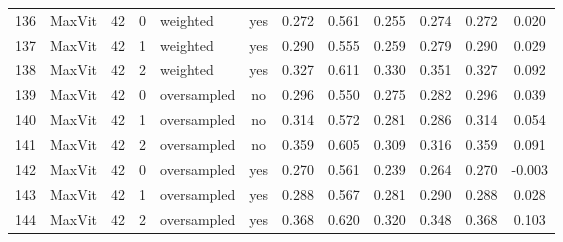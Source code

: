 \documentclass[a4paper,10pt]{book}
\begin{document}
\begin{scriptsize}
\begin{longtable}{@{}l l c c l c c c c c c c@{}}
        136 & MaxVit & 42 & 0 & weighted & yes & 0.272 & 0.561 & 0.255 & 0.274 & 0.272 & 0.020 \\ 
        137 & MaxVit & 42 & 1 & weighted & yes & 0.290 & 0.555 & 0.259 & 0.279 & 0.290 & 0.029 \\ 
        138 & MaxVit & 42 & 2 & weighted & yes & 0.327 & 0.611 & 0.330 & 0.351 & 0.327 & 0.092 \\ 
        139 & MaxVit & 42 & 0 & oversampled & no & 0.296 & 0.550 & 0.275 & 0.282 & 0.296 & 0.039 \\ 
        140 & MaxVit & 42 & 1 & oversampled & no & 0.314 & 0.572 & 0.281 & 0.286 & 0.314 & 0.054 \\ 
        141 & MaxVit & 42 & 2 & oversampled & no & 0.359 & 0.605 & 0.309 & 0.316 & 0.359 & 0.091 \\ 
        142 & MaxVit & 42 & 0 & oversampled & yes & 0.270 & 0.561 & 0.239 & 0.264 & 0.270 & -0.003 \\ 
        143 & MaxVit & 42 & 1 & oversampled & yes & 0.288 & 0.567 & 0.281 & 0.290 & 0.288 & 0.028 \\ 
        144 & MaxVit & 42 & 2 & oversampled & yes & 0.368 & 0.620 & 0.320 & 0.348 & 0.368 & 0.103 \\ 
\end{longtable}
\end{scriptsize}
\end{document}
